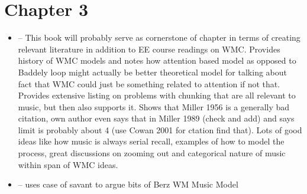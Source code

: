 \documentclass[]{book}
\theoremstyle{definition}
\theoremstyle{definition}
\theoremstyle{definition}
\theoremstyle{remark}
\begin{document}
\hypertarget{chapter-3}{%
\section{Chapter 3}\label{chapter-3}}

\begin{itemize}
\item
  \citep{cowanWorkingMemoryCapacity2005} -- This book will probably
  serve as cornerstone of chapter in terms of creating relevant
  literature in addition to EE course readings on WMC. Provides history
  of WMC models and notes how attention based model as opposed to
  Baddely loop might actually be better theoretical model for talking
  about fact that WMC could just be something related to attention if
  not that. Provides extensive listing on problems with chunking that
  are all relevant to music, but then also supports it. Shows that
  Miller 1956 is a generally bad citation, own author even says that in
  Miller 1989 (check and add) and says limit is probably about 4 (use
  Cowan 2001 for ctation find that). Lots of good ideas like how music
  is always serial recall, examples of how to model the process, great
  discussions on zooming out and categorical nature of music within span
  of WMC ideas.
\item
  \citep{ockelfordMusicModuleWorking2007} -- uses case of savant to
  argue bits of Berz WM Music Model
\end{itemize}


\end{document}
